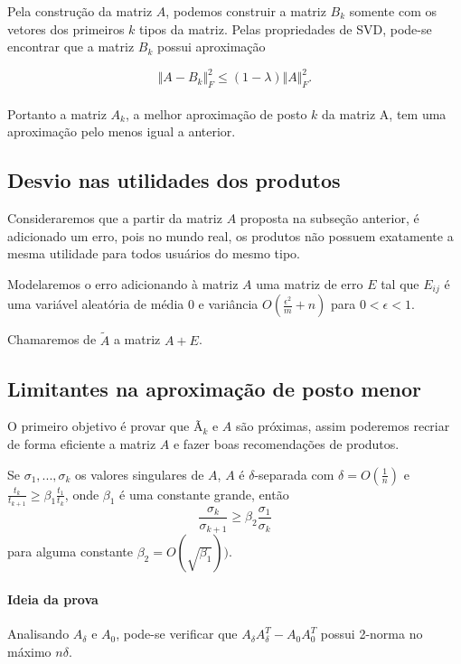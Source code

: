 \documentclass[a4paper,10pt]{article}
\begin{document}
Pela construção da matriz $A$, podemos construir a matriz $B_k$ somente
com os vetores dos primeiros $k$ tipos da matriz. Pelas propriedades de 
SVD, pode-se encontrar que a matriz $B_k$ possui aproximação 

\begin{equation}
\Vert A - B_k\Vert^2_F \leq ( 1 - \lambda ) \Vert A \Vert^2_F.
\end{equation}
\\
Portanto a matriz $A_k$, a melhor aproximação de posto $k$ da matriz A, tem uma
aproximação pelo menos igual a anterior.

\subsection{Desvio nas utilidades dos produtos}

Consideraremos que a partir da matriz $A$ proposta na subseção anterior, é
adicionado um erro, pois no mundo real, os produtos não possuem exatamente
a mesma utilidade para todos usuários do mesmo tipo.

 Modelaremos o erro adicionando à matriz $A$ uma matriz de erro $E$ tal
que $E_{ij}$ é uma variável aleatória de média 0 e variância 
$O(\frac{\epsilon^2}{m} + n )$ para $0 < \epsilon < 1$.

Chamaremos de $\tilde A$ a matriz $ A + E $.

\subsection{Limitantes na aproximação de posto menor}

O primeiro objetivo é provar que Ã$_k$ e $A$ são próximas, assim poderemos
recriar de forma eficiente a matriz $A$ e fazer boas recomendações de 
produtos. 

\begin{lema}
 Se $\sigma_1, ..., \sigma_k$ os valores singulares de $A$, $A$ é $\delta$-separada com $\delta = O(\frac{1}{n})$ e $\frac{t_k}{t_{k+1}} \geq \beta_1 \frac{t_1}{t_k}$, onde $\beta_1$ é uma constante grande, então 
\begin{equation}
\frac{\sigma_k}{\sigma_{k+1}} \geq \beta_2 \frac{\sigma_1}{\sigma_{k}}
\end{equation}
para alguma constante $\beta_2 = O (\sqrt{\beta_1}))$.

\end{lema}
\paragraph{Ideia da prova\\}
Analisando $A_\delta$ e $A_0$, pode-se verificar que $A_\delta A_\delta^T - A_0 A_0^T$ possui 2-norma no máximo $n \delta$.
\end{document}

